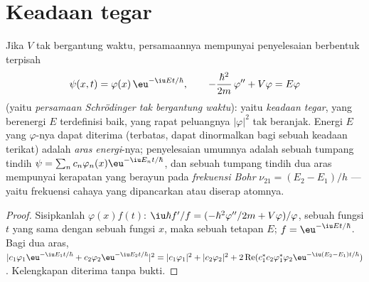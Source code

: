 \section{Keadaan tegar}

\begin{theorem}\label{thm:b2:schrodinger-wave-functions:stationary}
Jika $V$ tak bergantung waktu, persamaannya mempunyai penyelesaian berbentuk
terpisah
\[
\psi(x,t) = \varphi(x)\,\eu^{-\iu Et/\hbar}, \qquad
-\frac{\hbar^2}{2m}\,\varphi'' + V\varphi = E\varphi
\]
(yaitu \emph{persamaan Schrödinger tak bergantung waktu}): yaitu \emph{keadaan tegar}, yang berenergi $E$ terdefinisi baik, yang rapat peluangnya
$|\varphi|^2$ tak beranjak. Energi $E$ yang $\varphi$-nya
dapat diterima (terbatas, dapat dinormalkan bagi sebuah keadaan terikat) adalah
\emph{aras energi}-nya; penyelesaian umumnya adalah sebuah tumpang tindih $\psi =
\sum_nc_n\varphi_n(x)\eu^{-\iu E_nt/\hbar}$, dan sebuah tumpang tindih dua aras
mempunyai kerapatan yang berayun pada \emph{frekuensi Bohr} $\nu_{21} = (E_2 - E_1)/h$ --- yaitu frekuensi cahaya yang
dipancarkan atau diserap atomnya.
\end{theorem}

\begin{proof}
Sisipkanlah $\varphi(x)f(t)$: $\iu\hbar f'/f = (-\hbar^2\varphi''/2m + V\varphi)/\varphi$,
sebuah fungsi $t$ yang sama dengan sebuah fungsi $x$, maka sebuah tetapan $E$; $f
= \eu^{-\iu Et/\hbar}$. Bagi dua aras, $|c_1\varphi_1\eu^{-\iu E_1t/\hbar} +
c_2\varphi_2\eu^{-\iu E_2t/\hbar}|^2 = |c_1\varphi_1|^2 + |c_2\varphi_2|^2 +
2\operatorname{Re}(c_1^*c_2\varphi_1^*\varphi_2\eu^{-\iu(E_2 - E_1)t/\hbar})$.
Kelengkapan  diterima tanpa bukti.
\end{proof}

